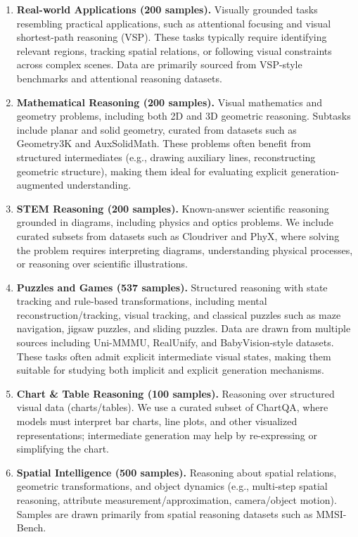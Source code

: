 \documentclass{article}
\theoremstyle{plain}
\theoremstyle{definition}
\theoremstyle{remark}
\begin{document}
\begin{enumerate}
    \item \textbf{Real-world Applications (200 samples).} Visually grounded tasks resembling practical applications, such as attentional focusing and visual shortest-path reasoning (VSP). These tasks typically require identifying relevant regions, tracking spatial relations, or following visual constraints across complex scenes. Data are primarily sourced from VSP-style benchmarks and attentional reasoning datasets.

    \item \textbf{Mathematical Reasoning (200 samples).} Visual mathematics and geometry problems, including both 2D and 3D geometric reasoning. Subtasks include planar and solid geometry, curated from datasets such as Geometry3K and AuxSolidMath. These problems often benefit from structured intermediates (e.g., drawing auxiliary lines, reconstructing geometric structure), making them ideal for evaluating explicit generation-augmented understanding.

    \item \textbf{STEM Reasoning (200 samples).} Known-answer scientific reasoning grounded in diagrams, including physics and optics problems. We include curated subsets from datasets such as Cloudriver and PhyX, where solving the problem requires interpreting diagrams, understanding physical processes, or reasoning over scientific illustrations.

    \item \textbf{Puzzles and Games (537 samples).} Structured reasoning with state tracking and rule-based transformations, including mental reconstruction/tracking, visual tracking, and classical puzzles such as maze navigation, jigsaw puzzles, and sliding puzzles. Data are drawn from multiple sources including Uni-MMMU, RealUnify, and BabyVision-style datasets. These tasks often admit explicit intermediate visual states, making them suitable for studying both implicit and explicit generation mechanisms.

    \item \textbf{Chart \& Table Reasoning (100 samples).} Reasoning over structured visual data (charts/tables). We use a curated subset of ChartQA, where models must interpret bar charts, line plots, and other visualized representations; intermediate generation may help by re-expressing or simplifying the chart.

    \item \textbf{Spatial Intelligence (500 samples).} Reasoning about spatial relations, geometric transformations, and object dynamics (e.g., multi-step spatial reasoning, attribute measurement/approximation, camera/object motion). Samples are drawn primarily from spatial reasoning datasets such as MMSI-Bench.


\end{enumerate}
\end{document}
